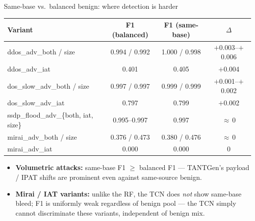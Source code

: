 \documentclass[10pt,aspectratio=169]{beamer}
\newcommand{\good}[1]{\textcolor{good}{\textbf{#1}}}
\newcommand{\warn}[1]{\textcolor{warn}{\textbf{#1}}}
\begin{document}
\begin{frame}{Same-base vs.\ balanced benign: where detection is harder}
\centering\small
\begin{tabular}{lcc>{\columncolor{warn!10}}c}
\toprule
\textbf{Variant} & \textbf{F1 (balanced)} & \textbf{F1 (same-base)} & \textbf{$\Delta$} \\
\midrule
\rowcolor{good!15} ddos\_adv\_both / size        & 0.994 / 0.992 & 1.000 / 0.998 & $+$0.003--$+$0.006 \\
\rowcolor{warn!15} ddos\_adv\_iat                & 0.401 & 0.405 & $+$0.004 \\
\rowcolor{good!15} dos\_slow\_adv\_both / size   & 0.997 / 0.997 & 0.999 / 0.999 & $+$0.001--$+$0.002 \\
\rowcolor{warn!15} dos\_slow\_adv\_iat           & 0.797 & 0.799 & $+$0.002 \\
\rowcolor{good!15} ssdp\_flood\_adv\_\{both, iat, size\} & 0.995--0.997 & 0.997 & $\approx$\,0 \\
\rowcolor{warn!15} mirai\_adv\_both / size       & 0.376 / 0.473 & 0.380 / 0.476 & $\approx$\,0 \\
\rowcolor{bad!15}  mirai\_adv\_iat               & 0.000 & 0.000 & 0 \\
\bottomrule
\end{tabular}

\vspace{0.4em}
\begin{itemize}\small
  \item \good{Volumetric attacks:} same-base F1 $\geq$ balanced F1 --- TANTGen's
        payload / IPAT shifts are prominent even against same-source benign.
  \item \warn{Mirai / IAT variants:} unlike the RF, the TCN does \emph{not}
        show same-base bleed; F1 is uniformly weak regardless of benign pool
        --- the TCN simply cannot discriminate these variants, independent
        of benign mix.
\end{itemize}
\end{frame}
\end{document}
